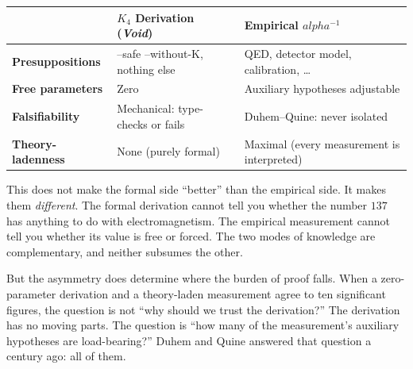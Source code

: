 \documentclass[11pt,a4paper]{book}
\def\alpha{alpha}%
\def\texttt#1{#1}%
\begin{document}
\begin{center}
\begin{tabular}{lll}
\toprule
 & \textbf{$K_4$ Derivation (\textit{Void})} & \textbf{Empirical $\alpha^{-1}$} \\
\midrule
\textbf{Presuppositions} & \texttt{--safe --without-K}, nothing else & QED, detector model, calibration, \ldots \\
\textbf{Free parameters} & Zero & Auxiliary hypotheses adjustable \\
\textbf{Falsifiability} & Mechanical: type-checks or fails & Duhem--Quine: never isolated \\
\textbf{Theory-ladenness} & None (purely formal) & Maximal (every measurement is interpreted) \\
\bottomrule
\end{tabular}
\end{center}

This does not make the formal side ``better'' than the empirical side. It makes them \emph{different}. The formal derivation cannot tell you whether the number $137$ has anything to do with electromagnetism. The empirical measurement cannot tell you whether its value is free or forced. The two modes of knowledge are complementary, and neither subsumes the other.

But the asymmetry does determine where the burden of proof falls. When a zero-parameter derivation and a theory-laden measurement agree to ten significant figures, the question is not ``why should we trust the derivation?'' The derivation has no moving parts. The question is ``how many of the measurement's auxiliary hypotheses are load-bearing?'' Duhem and Quine answered that question a century ago: all of them.
\end{document}
